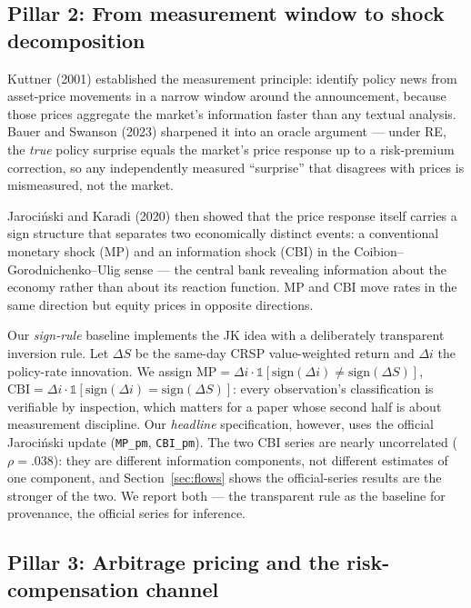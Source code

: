 \documentclass[11pt]{article}
\begin{document}
\subsection{Pillar 2: From measurement window to shock decomposition}\label{pillar-2-from-measurement-window-to-shock-decomposition}

Kuttner (2001) established the measurement principle: identify policy news from asset-price movements in a narrow window around the announcement, because those prices aggregate the market's information faster than any textual analysis. Bauer and Swanson (2023) sharpened it into an oracle argument --- under RE, the \emph{true} policy surprise equals the market's price response up to a risk-premium correction, so any independently measured ``surprise'' that disagrees with prices is mismeasured, not the market.

Jarociński and Karadi (2020) then showed that the price response itself carries a sign structure that separates two economically distinct events: a conventional monetary shock (MP) and an information shock (CBI) in the Coibion--Gorodnichenko--Ulig sense --- the central bank revealing information about the economy rather than about its reaction function. MP and CBI move rates in the same direction but equity prices in opposite directions.

Our \emph{sign-rule} baseline implements the JK idea with a deliberately
transparent inversion rule. Let $\Delta S$ be the same-day CRSP value-weighted
return and $\Delta i$ the policy-rate innovation. We assign
$\text{MP} = \Delta i \cdot \mathbb{1}[\text{sign}(\Delta i) \neq \text{sign}(\Delta S)]$,
$\text{CBI} = \Delta i \cdot \mathbb{1}[\text{sign}(\Delta i) = \text{sign}(\Delta S)]$:
every observation's classification is verifiable by inspection, which matters
for a paper whose second half is about measurement discipline. Our
\emph{headline} specification, however, uses the official Jaroci\'{n}ski
update (\texttt{MP\_pm}, \texttt{CBI\_pm}). The two CBI series are nearly
uncorrelated ($\rho = .038$): they are different information components, not
different estimates of one component, and Section~\ref{sec:flows} shows the
official-series results are the stronger of the two. We report both ---
the transparent rule as the baseline for provenance, the official series for
inference.
\subsection{Pillar 3: Arbitrage pricing and the risk-compensation channel}\label{pillar-3-arbitrage-pricing-and-the-risk-compensation-channel}
\end{document}
